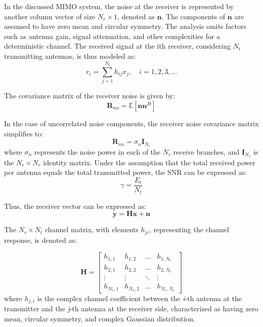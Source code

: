 \documentclass[lettersize,journal]{IEEEtran}
\begin{document}
In the discussed MIMO system, the noise at the receiver is represented by another column vector of size \( N_r \times 1 \), denoted as \( \mathbf{n} \). The components of \( \mathbf{n} \) are assumed to have zero mean and circular symmetry. The analysis omits factors such as antenna gain, signal attenuation, and other complexities for a deterministic channel. The received signal at the ith receiver, considering \( N_t \) transmitting antennas, is thus modeled as:
\begin{equation}
r_i = \sum_{j=1}^{N_t} h_{ij} x_j, \quad i = 1, 2, 3, \ldots
\end{equation}

The covariance matrix of the receiver noise is given by:
\begin{equation}
\mathbf{R}_{nn} = \mathbb{E}\left[\mathbf{n} \mathbf{n}^H\right]
\end{equation}

In the case of uncorrelated noise components, the receiver noise covariance matrix simplifies to:
\begin{equation}
\mathbf{R}_{nn} = \sigma_n \mathbf{I}_{N_r}
\end{equation}
where \( \sigma_n\) represents the noise power in each of the \( N_r \) receive branches, and \( \mathbf{I}_{N_r} \) is the \( N_r \times N_r \) identity matrix. Under the assumption that the total received power per antenna equals the total transmitted power, the SNR can be expressed as:
\begin{equation}
\gamma = \frac{E_t}{N_t}
\end{equation}

Thus, the receiver vector can be expressed as:
\begin{equation} \label{eq:sysequ}
\mathbf{y} = \mathbf{Hx} + \mathbf{n}
\end{equation}

The \( N_r \times N_t \) channel matrix, with elements \( h_{ji} \), representing the channel response, is denoted as:

\begin{equation}
\mathbf{H} = 
\begin{bmatrix}
h_{1,1} & h_{1,2} & \ldots & h_{1,N_t} \\
h_{2,1} & h_{2,2} & \ldots & h_{2,N_t} \\
\vdots  & \vdots  & \ddots & \vdots  \\
h_{N_r,1} & h_{N_r,2} & \ldots & h_{N_r,N_t}
\end{bmatrix}
\end{equation}
where \( h_{j,i} \) is the complex channel coefficient between the \textit{i}-th antenna at the transmitter and the \textit{j}-th antenna at the receiver side, characterized as having zero mean, circular symmetry, and complex Gaussian distribution.
\end{document}
